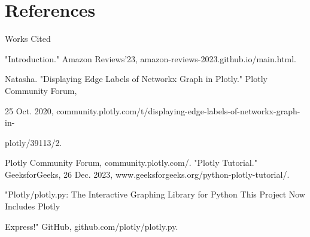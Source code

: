 \documentclass[fontsize=11pt]{article}
\begin{document}
\section*{References}

\begin{center}
Works Cited
\end{center}

\noindent "Introduction." Amazon Reviews'23, amazon-reviews-2023.github.io/main.html.
\vspace{\baselineskip}

\noindent Natasha. "Displaying Edge Labels of Networkx Graph in Plotly." Plotly Community Forum, 


25 Oct. 2020, community.plotly.com/t/displaying-edge-labels-of-networkx-graph-in-


plotly/39113/2.
\vspace{\baselineskip}


\noindent Plotly Community Forum, community.plotly.com/.
\vspace{\baselineskip}
\noindent "Plotly Tutorial." GeeksforGeeks, 26 Dec. 2023, www.geeksforgeeks.org/python-plotly-tutorial/.

\vspace{\baselineskip}
\noindent "Plotly/plotly.py: The Interactive Graphing Library for Python This Project Now Includes Plotly


Express!" GitHub, github.com/plotly/plotly.py.
\end{document}
